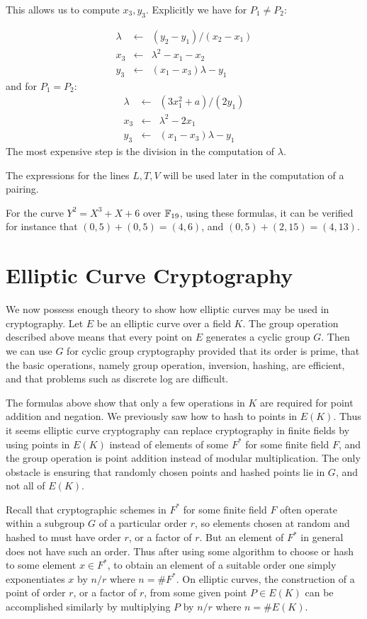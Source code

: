 This allows us to compute $x_3, y_3$. Explicitly we have for $P_1 \ne P_2$:

\[
\begin{array}{rcl}
\lambda &\gets& (y_2 - y_1)/(x_2 - x_1) \\
x_3 &\gets& \lambda^2 - x_1 - x_2 \\
y_3 &\gets& (x_1 - x_3) \lambda - y_1
\end{array}
\]
and for $P_1 = P_2$:
\[
\begin{array}{rcl}
\lambda &\gets& (3x_1^2 + a)/(2y_1) \\
x_3 &\gets& \lambda^2 - 2x_1 \\
y_3 &\gets& (x_1 - x_3) \lambda - y_1
\end{array}
\]
The most expensive step is the division in the computation of
$\lambda$.

The expressions for the lines $L,T,V$ will be used later in the computation
of a pairing.

For the curve $Y^2 = X^3 + X + 6$ over $\mathbb{F}_{19}$,
using these formulas, it can be verified for instance that
$(0, 5) + (0, 5) = (4, 6)$,
and $(0, 5) + (2, 15) = (4, 13)$.

\section {Elliptic Curve Cryptography}

We now possess enough theory to show how elliptic curves may be used
in cryptography.
Let $E$ be an elliptic curve over a field $K$.
The group operation described above means that every point on $E$
generates a cyclic group $G$.
Then we can use $G$ for cyclic group cryptography
provided that its order is prime,
that the basic operations, namely group operation, inversion, hashing,
are efficient, and that problems such as discrete log are difficult.

The formulas above show that only a few operations in $K$ are required for
point addition and negation.
We previously saw how to hash to points in $E(K)$.
Thus it seems elliptic curve cryptography can replace
cryptography in finite fields by using
points in $E(K)$ instead of elements of some $F^*$ for some finite field $F$,
and the group operation is point addition instead of modular multiplication.
The only obstacle is ensuring that randomly chosen points and hashed points
lie in $G$, and not all of $E(K)$.

Recall that cryptographic schemes in $F^*$ for some finite field $F$
often operate within a subgroup $G$ of a particular order $r$,
so elements chosen at random and hashed to must have
order $r$, or a factor of $r$. But an element of $F^*$
in general does not have such an order.
Thus after using some algorithm to
choose or hash to some element $x \in F^*$,
to obtain an element of a suitable order one simply exponentiates $x$
by $n / r$ where $n = \#F^*$.
On elliptic curves, the construction of a point of order $r$,
or a factor of $r$, from some given point $P \in E(K)$ can be accomplished
similarly by multiplying $P$ by
$n / r$ where $n = \#E(K)$.

